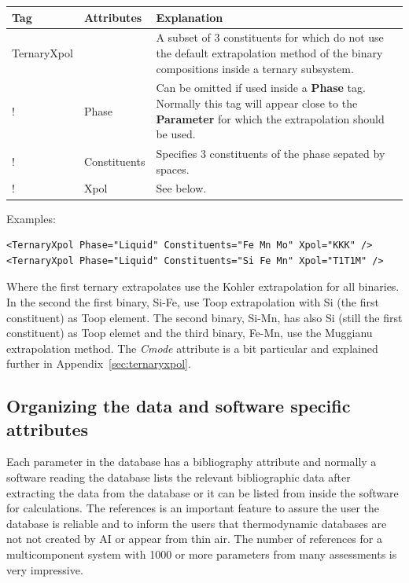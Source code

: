 \documentclass{article}
\begin{document}
\begin{tabular}{|p{} p{} p{}|}\hline
  Tag & Attributes & Explanation\\\hline

  TernaryXpol & & A subset of 3 constituents for which do not use the default
              extrapolation method of the binary compositions inside
              a ternary subsystem.\\
!       & Phase & Can be omitted if used inside a {\bf Phase} tag.  Normally  
              this tag will appear close to the {\bf Parameter} for which the
              extrapolation should be used.\\
!      & Constituents & Specifies 3 constituents of the phase sepated by
          spaces.\\
!      & Xpol & See below.\\\hline
\end{tabular}

Examples:

\begin{verbatim}
<TernaryXpol Phase="Liquid" Constituents="Fe Mn Mo" Xpol="KKK" />
<TernaryXpol Phase="Liquid" Constituents="Si Fe Mn" Xpol="T1T1M" />
\end{verbatim}

Where the first ternary extrapolates use the Kohler extrapolation for
all binaries.  In the second the first binary, Si-Fe, use Toop
extrapolation with Si (the first constituent) as Toop element.  The
second binary, Si-Mn, has also Si (still the first constituent) as
Toop elemet and the third binary, Fe-Mn, use the Muggianu
extrapolation method.  The {\em Cmode} attribute is a bit particular
and explained further in Appendix~\ref{sec:ternaryxpol}.

\newpage

\subsection{Organizing the data and software specific attributes}\label{sec:subsys}\label{sec:soft}\label{sec:last}

Each parameter in the database has a bibliography attribute and
normally a software reading the database lists the relevant
bibliographic data after extracting the data from the database or it
can be listed from inside the software for calculations.  The
references is an important feature to assure the user the database is
reliable and to inform the users that thermodynamic databases are not
not created by AI or appear from thin air.  The number of references
for a multicomponent system with 1000 or more parameters from many
assessments is very impressive.
\end{document}
